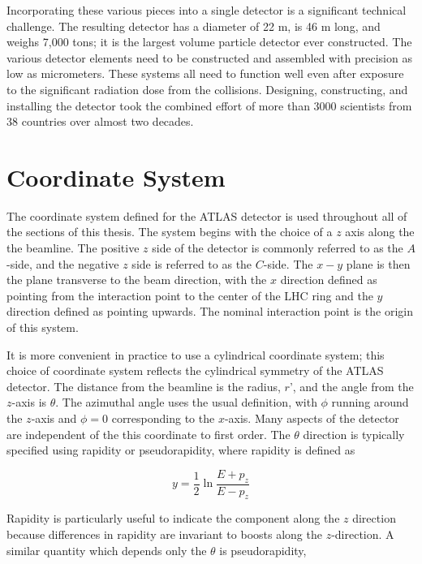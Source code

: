Incorporating these various pieces into a single detector is a significant technical challenge.
The resulting detector has a diameter of 22 m, is 46 m long, and weighs 7,000 tons; it is the largest volume particle detector ever constructed.
The various detector elements need to be constructed and assembled with precision as low as micrometers.
These systems all need to function well even after exposure to the significant radiation dose from the collisions.
Designing, constructing, and installing the detector took the combined effort of more than 3000 scientists from 38 countries over almost two decades.


\section{Coordinate System}

The coordinate system defined for the \ac{ATLAS} detector is used throughout all of the sections of this thesis.
The system begins with the choice of a $z$ axis along the the beamline.
The positive $z$ side of the detector is commonly referred to as the $A$-side, and the negative $z$ side is referred to as the $C$-side.
The $x-y$ plane is then the plane transverse to the beam direction, with the $x$ direction defined as pointing from the interaction point to the center of the \ac{LHC} ring and the $y$ direction defined as pointing upwards.
The nominal interaction point is the origin of this system.

It is more convenient in practice to use a cylindrical coordinate system; this choice of coordinate system reflects the cylindrical symmetry of the \ac{ATLAS} detector.
The distance from the beamline is the radius, $r$', and the angle from the $z$-axis is $\theta$.
The azimuthal angle uses the usual definition, with $\phi$ running around the $z$-axis and $\phi = 0$ corresponding to the $x$-axis.
Many aspects of the detector are independent of the this coordinate to first order.
The $\theta$ direction is typically specified using rapidity or pseudorapidity, where rapidity is defined as

\begin{equation}\label{eq:rapidity}
y = \frac{1}{2} \ln \frac{E + p_z}{E - p_z}
\end{equation}

\noindent Rapidity is particularly useful to indicate the component along the $z$ direction because differences in rapidity are invariant to boosts along the $z$-direction.
A similar quantity which depends only the $\theta$ is pseudorapidity, 

